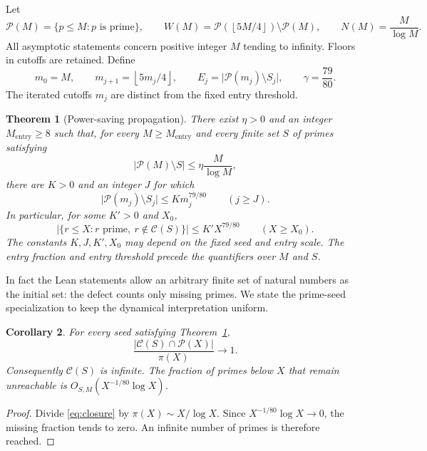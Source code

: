 \documentclass[11pt]{article}
\newtheorem{theorem}{Theorem}[section]
\newtheorem{corollary}[theorem]{Corollary}
\theoremstyle{definition}
\theoremstyle{remark}
\newcommand{\PP}{\mathcal P}
\newcommand{\Cl}{\mathcal C}
\newcommand{\card}[1]{\lvert #1\rvert}
\newcommand{\floor}[1]{\left\lfloor #1\right\rfloor}
\begin{document}
Let
\[
 \PP(M)=\{p\le M:p\text{ is prime}\},\qquad
 W(M)=\PP(\floor{5M/4})\setminus\PP(M),
 \qquad N(M)=\frac{M}{\log M}.
\]
All asymptotic statements concern positive integer \(M\) tending to
infinity. Floors in cutoffs are retained. Define
\begin{equation}\label{eq:cutoffs}
 m_0=M,\qquad m_{j+1}=\floor{5m_j/4},\qquad
 E_j=\card{\PP(m_j)\setminus S_j},\qquad \gamma=\frac{79}{80}.
\end{equation}
The iterated cutoffs \(m_j\) are distinct from the fixed entry threshold.

\begin{theorem}[Power-saving propagation]\label{thm:main}
There exist \(\eta>0\) and an integer \(M_{\mathrm{entry}}\ge8\) such that,
for every \(M\ge M_{\mathrm{entry}}\) and every finite set \(S\) of primes
satisfying
\begin{equation}\label{eq:entry}
 \card{\PP(M)\setminus S}\le\eta\frac{M}{\log M},
\end{equation}
there are \(K>0\) and an integer \(J\) for which
\begin{equation}\label{eq:stage}
 \card{\PP(m_j)\setminus S_j}\le K m_j^{79/80}
 \qquad(j\ge J).
\end{equation}
In particular, for some \(K'>0\) and \(X_0\),
\begin{equation}\label{eq:closure}
 \card{\{r\le X:r\text{ prime},\ r\notin\Cl(S)\}}
 \le K'X^{79/80}\qquad(X\ge X_0).
\end{equation}
The constants \(K,J,K',X_0\) may depend on the fixed seed and entry scale.
The entry fraction and entry threshold precede the quantifiers over
\(M\) and \(S\).
\end{theorem}

In fact the Lean statements allow an arbitrary finite set of natural
numbers as the initial set: the defect counts only missing primes.
We state the prime-seed specialization to keep the dynamical
interpretation uniform.

\begin{corollary}\label{cor:density}
For every seed satisfying Theorem~\ref{thm:main},
\[
 \frac{\card{\Cl(S)\cap\PP(X)}}{\pi(X)}\longrightarrow1.
\]
Consequently \(\Cl(S)\) is infinite. The fraction of primes below \(X\)
that remain unreachable is \(O_{S,M}(X^{-1/80}\log X)\).
\end{corollary}

\begin{proof}
Divide \eqref{eq:closure} by \(\pi(X)\sim X/\log X\).
Since \(X^{-1/80}\log X\to0\), the missing fraction tends to zero.
An infinite number of primes is therefore reached.
\end{proof}
\end{document}
